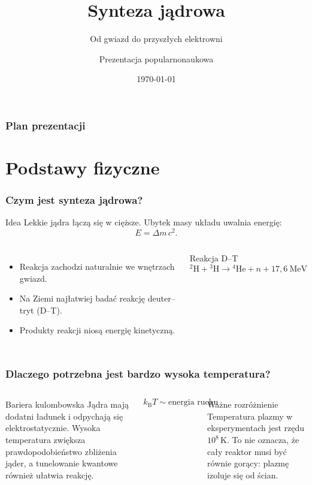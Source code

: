 \documentclass[aspectratio=169,11pt]{beamer}
\title{Synteza jądrowa}
\subtitle{Od gwiazd do przyszłych elektrowni}
\author{Prezentacja popularnonaukowa}
\institute{Fizyka energii}
\date{\today}
\begin{document}
\begin{frame}
  \titlepage
\end{frame}

\begin{frame}
  \frametitle{Plan prezentacji}
  \tableofcontents
\end{frame}

\section{Podstawy fizyczne}
\begin{frame}
  \frametitle{Czym jest synteza jądrowa?}
  \begin{block}{Idea}
    Lekkie jądra łączą się w cięższe. Ubytek masy układu uwalnia energię:
    \[
      E=\Delta m\,c^2.
    \]
  \end{block}
  \begin{columns}[T,onlytextwidth]
      \begin{itemize}
        \item Reakcja zachodzi naturalnie we wnętrzach gwiazd.
        \item Na Ziemi najłatwiej badać reakcję deuter--tryt (D--T).
        \item Produkty reakcji niosą energię kinetyczną.
      \end{itemize}
      \begin{exampleblock}{Reakcja D--T}
        \[
          {}^2\mathrm{H}+{}^3\mathrm{H}
          \rightarrow {}^4\mathrm{He}+n+17{,}6~\mathrm{MeV}
        \]
      \end{exampleblock}
  \end{columns}
\end{frame}

\begin{frame}
  \frametitle{Dlaczego potrzebna jest bardzo wysoka temperatura?}
  \begin{columns}[T,onlytextwidth]
      \begin{block}{Bariera kulombowska}
        Jądra mają dodatni ładunek i odpychają się elektrostatycznie.
        Wysoka temperatura zwiększa prawdopodobieństwo zbliżenia jąder,
        a tunelowanie kwantowe również ułatwia reakcję.
      \end{block}
      \[
        k_{\mathrm B}T \sim \text{energia ruchu cząstek}
      \]
      \begin{alertblock}{Ważne rozróżnienie}
        Temperatura plazmy w eksperymentach jest rzędu
        \(10^8\,\mathrm K\). To nie oznacza, że cały reaktor musi być
        równie gorący: plazmę izoluje się od ścian.
      \end{alertblock}
  \end{columns}
\end{frame}
\end{document}
